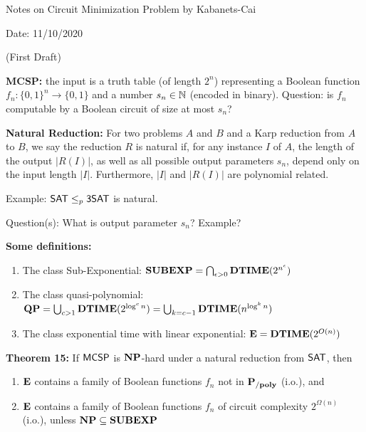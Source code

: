 \documentclass[12pt]{article}
\theoremstyle{definition}
\begin{document}
\smallskip
\smallskip
\smallskip

\begin{center}

{\Large Notes on Circuit Minimization Problem by Kabanets-Cai}

\bigskip
{\normalsize Date: 11/10/2020}

\bigskip
{\normalsize (First Draft)}

\end{center}

\textbf{MCSP:} the input is a truth table (of length $2^n$) representing a Boolean function $f_n: \{0, 1\}^n \rightarrow \{0, 1\}$ and a number $s_n \in {\mathbb{N}}$ (encoded in binary). Question: is $f_n$ computable by a Boolean circuit of size at most $s_n$?

\bigskip
\textbf{Natural Reduction:} For two problems $A$ and $B$ and a Karp reduction from $A$ to $B$, we say the reduction $R$ is natural if, for any instance $I$ of $A$, the length of the output $|R(I)|$, as well as all possible output parameters $s_n$, depend only on the input length $|I|$. Furthermore, $|I|$ and $|R(I)|$ are polynomial related.

Example: $\mathsf{SAT} \leq_p \mathsf{3SAT}$ is natural. 

Question(s): What is output parameter $s_n$? Example?

\bigskip
\textbf{Some definitions:}
\begin{enumerate} [1.]
	\item The class Sub-Exponential: $\mathbf{SUBEXP} = \bigcap_{\epsilon > 0} \mathbf{DTIME}(2^{n^{\epsilon}})$
	\item The class quasi-polynomial: $\mathbf{QP} = \bigcup_{c > 1}\mathbf{DTIME}(2^{\log^c n}) = \bigcup_{k = c-1}\mathbf{DTIME}(n^{\log^k n})$
	\item The class exponential time with linear exponential: $\mathbf{E} = \mathbf{DTIME}(2^{O(n)})$
\end{enumerate}

\bigskip
\textbf{Theorem 15:} If $\mathsf{MCSP}$ is $\mathbf{NP}$-hard under a natural reduction from $\mathsf{SAT}$, then
\begin{enumerate} [1.]
	\item $\mathbf{E}$ contains a family of Boolean functions $f_n$ not in $\mathbf{P_{/poly}}$ (i.o.), and
	\item $\mathbf{E}$ contains a family of Boolean functions $f_n$ of circuit complexity $2^{\Omega(n)}$ (i.o.), unless $\mathbf{NP} \subseteq \mathbf{SUBEXP}$
\end{enumerate}
\end{document}
